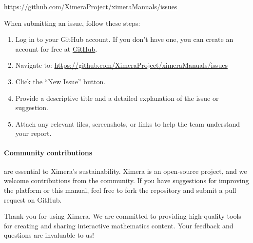 \documentclass{ximera}
\begin{document}
\begin{center}
    \url{https://github.com/XimeraProject/ximeraManuals/issues}
\end{center}

When submitting an issue, follow these steps:
\begin{enumerate}
    \item Log in to your GitHub account. If you don't have one, you can create
          an account for free at \href{https://github.com}{GitHub}.
    \item Navigate to:
          \url{https://github.com/XimeraProject/ximeraManuals/issues}
    \item Click the ``New Issue'' button.
    \item Provide a descriptive title and a detailed explanation of the issue
          or suggestion.
    \item Attach any relevant files, screenshots, or links to help the team
          understand your report.
\end{enumerate}

\paragraph{Community contributions} are essential to Ximera's sustainability. 
Ximera is an open-source project, and we welcome contributions from the
community. If you have suggestions for improving the platform or this manual,
feel free to fork the repository and submit a pull request on GitHub.





Thank you for using Ximera. We are committed to providing high-quality tools
for creating and sharing interactive mathematics content. Your feedback and
questions are invaluable to us!
\end{document}
